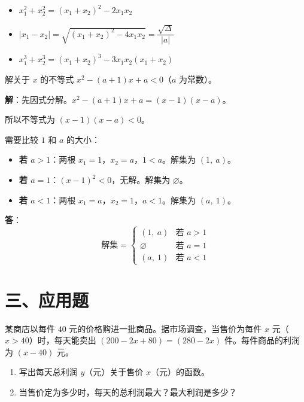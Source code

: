 \documentclass[12pt, a4paper]{ctexart}
\begin{document}
\begin{tipbox}[韦达定理常用公式]
\begin{itemize}[leftmargin=2em]
  \item $x_1^2 + x_2^2 = (x_1 + x_2)^2 - 2x_1 x_2$
  \item $|x_1 - x_2| = \sqrt{(x_1 + x_2)^2 - 4x_1 x_2} = \dfrac{\sqrt{\Delta}}{|a|}$
  \item $x_1^3 + x_2^3 = (x_1 + x_2)^3 - 3x_1 x_2(x_1 + x_2)$
\end{itemize}
\end{tipbox}

\begin{examplebox}[【例8】不等式的综合应用]
解关于 $x$ 的不等式 $x^2 - (a+1)x + a < 0$（$a$ 为常数）。
\end{examplebox}

\textbf{解}：先因式分解。$x^2 - (a+1)x + a = (x - 1)(x - a)$。

所以不等式为 $(x-1)(x-a) < 0$。

需要比较 $1$ 和 $a$ 的大小：
\begin{itemize}[leftmargin=2em]
  \item \textbf{若 $a > 1$}：两根 $x_1 = 1$，$x_2 = a$，$1 < a$。解集为 $(1,\ a)$。
  \item \textbf{若 $a = 1$}：$(x-1)^2 < 0$，无解。解集为 $\varnothing$。
  \item \textbf{若 $a < 1$}：两根 $x_1 = a$，$x_2 = 1$，$a < 1$。解集为 $(a,\ 1)$。
\end{itemize}
\textbf{答}：
\[
  \text{解集} = \begin{cases} (1,\ a) & \text{若 } a > 1 \\ \varnothing & \text{若 } a = 1 \\ (a,\ 1) & \text{若 } a < 1 \end{cases}
\]

\section*{\textcolor{apppurple}{三、应用题}}

\begin{appbox}[【应用1】利润最大化问题]
某商店以每件 $40$ 元的价格购进一批商品。据市场调查，当售价为每件 $x$ 元（$x > 40$）时，每天能卖出 $(200 - 2x + 80) = (280 - 2x)$ 件。每件商品的利润为 $(x - 40)$ 元。
\begin{enumerate}[label=(\arabic*)]
  \item 写出每天总利润 $y$（元）关于售价 $x$（元）的函数。
  \item 当售价定为多少时，每天的总利润最大？最大利润是多少？
\end{enumerate}
\end{appbox}
\end{document}
